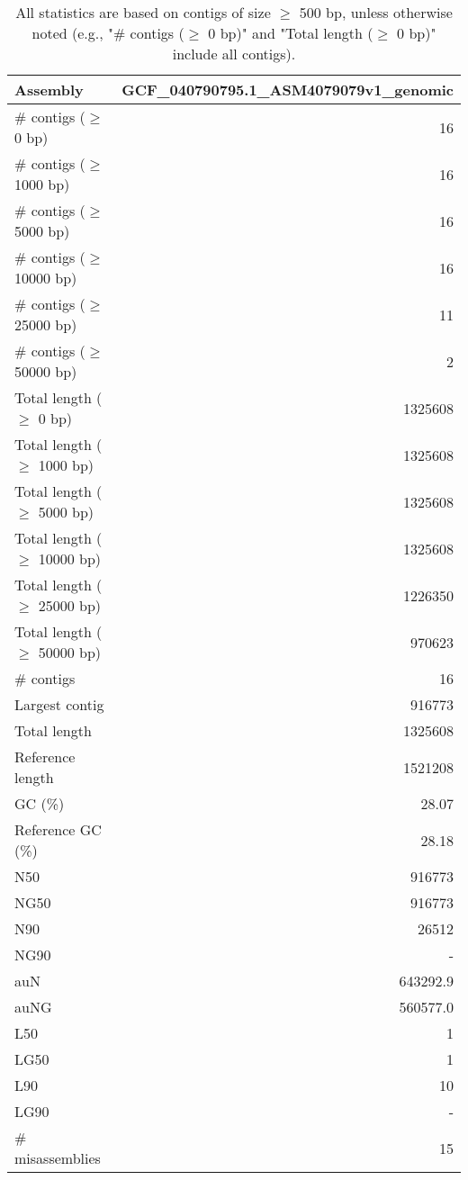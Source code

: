 \documentclass[12pt,a4paper]{article}
\begin{document}
\begin{table}[ht]
\begin{center}
\caption{All statistics are based on contigs of size $\geq$ 500 bp, unless otherwise noted (e.g., "\# contigs ($\geq$ 0 bp)" and "Total length ($\geq$ 0 bp)" include all contigs).}
\begin{tabular}{|l*{1}{|r}|}
\hline
Assembly & GCF\_040790795.1\_ASM4079079v1\_genomic \\ \hline
\# contigs ($\geq$ 0 bp) & 16 \\ \hline
\# contigs ($\geq$ 1000 bp) & 16 \\ \hline
\# contigs ($\geq$ 5000 bp) & 16 \\ \hline
\# contigs ($\geq$ 10000 bp) & 16 \\ \hline
\# contigs ($\geq$ 25000 bp) & 11 \\ \hline
\# contigs ($\geq$ 50000 bp) & 2 \\ \hline
Total length ($\geq$ 0 bp) & 1325608 \\ \hline
Total length ($\geq$ 1000 bp) & 1325608 \\ \hline
Total length ($\geq$ 5000 bp) & 1325608 \\ \hline
Total length ($\geq$ 10000 bp) & 1325608 \\ \hline
Total length ($\geq$ 25000 bp) & 1226350 \\ \hline
Total length ($\geq$ 50000 bp) & 970623 \\ \hline
\# contigs & 16 \\ \hline
Largest contig & 916773 \\ \hline
Total length & 1325608 \\ \hline
Reference length & 1521208 \\ \hline
GC (\%) & 28.07 \\ \hline
Reference GC (\%) & 28.18 \\ \hline
N50 & 916773 \\ \hline
NG50 & 916773 \\ \hline
N90 & 26512 \\ \hline
NG90 & - \\ \hline
auN & 643292.9 \\ \hline
auNG & 560577.0 \\ \hline
L50 & 1 \\ \hline
LG50 & 1 \\ \hline
L90 & 10 \\ \hline
LG90 & - \\ \hline
\# misassemblies & 15 \\ \hline

\end{tabular}
\end{center}
\end{table}
\end{document}
